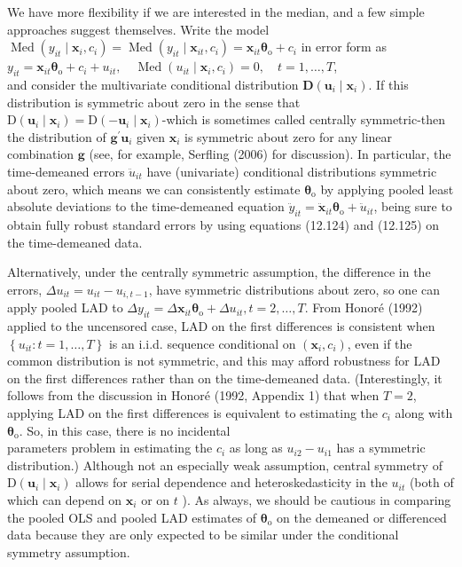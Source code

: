 \documentclass[10pt]{article}
\begin{document}
We have more flexibility if we are interested in the median, and a few simple approaches suggest themselves. Write the model $\operatorname{Med}\left(y_{i t} \mid \mathbf{x}_{i}, c_{i}\right)=\operatorname{Med}\left(y_{i t} \mid \mathbf{x}_{i t}, c_{i}\right)= \mathbf{x}_{i t} \boldsymbol{\theta}_{\mathrm{o}}+c_{i}$ in error form as\\
$y_{i t}=\mathbf{x}_{i t} \boldsymbol{\theta}_{\mathrm{o}}+c_{i}+u_{i t}, \quad \operatorname{Med}\left(u_{i t} \mid \mathbf{x}_{i}, c_{i}\right)=0, \quad t=1, \ldots, T$,\\
and consider the multivariate conditional distribution $\mathbf{D}\left(\mathbf{u}_{i} \mid \mathbf{x}_{i}\right)$. If this distribution is symmetric about zero in the sense that $\mathrm{D}\left(\mathbf{u}_{i} \mid \mathbf{x}_{i}\right)=\mathrm{D}\left(-\mathbf{u}_{i} \mid \mathbf{x}_{i}\right)$-which is sometimes called centrally symmetric-then the distribution of $\mathbf{g}^{\prime} \mathbf{u}_{i}$ given $\mathbf{x}_{i}$ is symmetric about zero for any linear combination $\mathbf{g}$ (see, for example, Serfling (2006) for discussion). In particular, the time-demeaned errors $\ddot{u}_{i t}$ have (univariate) conditional distributions symmetric about zero, which means we can consistently estimate $\boldsymbol{\theta}_{\mathrm{o}}$ by applying pooled least absolute deviations to the time-demeaned equation $\ddot{y}_{i t}=\ddot{\mathbf{x}}_{i t} \boldsymbol{\theta}_{\mathrm{o}}+\ddot{u}_{i t}$, being sure to obtain fully robust standard errors by using equations (12.124) and (12.125) on the time-demeaned data.

Alternatively, under the centrally symmetric assumption, the difference in the errors, $\Delta u_{i t}=u_{i t}-u_{i, t-1}$, have symmetric distributions about zero, so one can apply pooled LAD to $\Delta y_{i t}=\Delta \mathbf{x}_{i t} \boldsymbol{\theta}_{\mathrm{o}}+\Delta u_{i t}, t=2, \ldots, T$. From Honoré (1992) applied to the uncensored case, LAD on the first differences is consistent when $\left\{u_{i t}: t=1, \ldots, T\right\}$ is an i.i.d. sequence conditional on $\left(\mathbf{x}_{i}, c_{i}\right)$, even if the common distribution is not symmetric, and this may afford robustness for LAD on the first differences rather than on the time-demeaned data. (Interestingly, it follows from the discussion in Honoré (1992, Appendix 1) that when $T=2$, applying LAD on the first differences is equivalent to estimating the $c_{i}$ along with $\boldsymbol{\theta}_{\mathrm{o}}$. So, in this case, there is no incidental\\
parameters problem in estimating the $c_{i}$ as long as $u_{i 2}-u_{i 1}$ has a symmetric distribution.) Although not an especially weak assumption, central symmetry of $\mathrm{D}\left(\mathbf{u}_{i} \mid \mathbf{x}_{i}\right)$ allows for serial dependence and heteroskedasticity in the $u_{i t}$ (both of which can depend on $\mathbf{x}_{i}$ or on $t$ ). As always, we should be cautious in comparing the pooled OLS and pooled LAD estimates of $\boldsymbol{\theta}_{\mathrm{o}}$ on the demeaned or differenced data because they are only expected to be similar under the conditional symmetry assumption.
\end{document}
